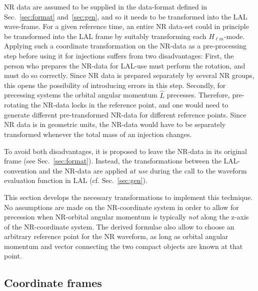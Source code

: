 \documentclass[11pt,tightenlines,article,amssymb,amsmath,amsfonts,superscriptaddress,nofootinbib]{revtex4}
\newcommand{\lNR}{\hat L}
\begin{document}
NR data are assumed to be supplied in the data-format defined in
Sec.~\ref{sec:format} and~\ref{sec:gen}, and so it needs to be
transformed into the LAL wave-frame.  For a given reference time, an
entire NR data-set could in principle be transformed into the LAL
frame by suitably transforming each $H_{\ell m}$-mode.  Applying
such a coordinate transformation on the NR-data as a pre-processing step
before using it for injections suffers from two disadvantages:
First, the person who prepares the NR-data for LAL-use must perform
the rotation, and must do so correctly. Since NR data is prepared
separately by several NR groups, this opens the possibility of
introducing errors in this step.  Secondly, for precessing systems the
orbital angular momentum $\lNR$ precesses.  Therefore, pre-rotating
the NR-data locks in the reference point, and one would need to
generate different pre-transformed NR-data for different reference points.
Since NR data is in geometric units, the NR-data would have to be
separately transformed whenever the total mass of an injection changes.

To avoid both disadvantages, it is proposed to leave the NR-data in
its original frame (see Sec.~\ref{sec:format}).  Instead, the transformations between the
LAL-convention and the NR-data are applied \emph{at use} during the
call to the waveform evaluation function in LAL (cf. Sec.~\ref{sec:gen}).

This section develops the necessary transformations to implement this
technique. No assumptions are made on the NR-coordinate system in
order to allow for precession when NR-orbital angular momentum is
typically \emph{not} along the z-axis of the NR-coordinate system.
The derived formulae also allow to choose an arbitrary reference point
for the NR waveform, as long as orbital angular momentum and vector
connecting the two compact objects are known at that point.




\subsection{Coordinate frames}
\label{sec:Frames}
\end{document}
